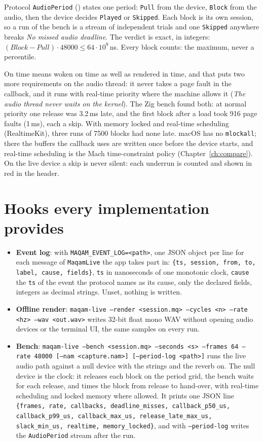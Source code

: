 \documentclass[11pt,oneside]{book}
\newcommand{\cmd}[1]{\texttt{#1}}
\begin{document}
Protocol \texttt{AudioPeriod} () states one
period: \texttt{Pull} from the device, \texttt{Block} from the audio, then the
device decides \texttt{Played} or \texttt{Skipped}. Each block is its own
session, so a run of the bench is a stream of independent trials and one
\texttt{Skipped} anywhere breaks \emph{No missed audio deadline}. The verdict
is exact, in integers: $(\mathit{Block}-\mathit{Pull}) \cdot 48000 \le 64
\cdot 10^9$\,ns. Every block counts: the maximum, never a percentile.

On time means woken on time as well as rendered in time, and that puts two
more requirements on the audio thread: it never takes a page fault in the
callback, and it runs with real-time priority where the machine allows it
(\emph{The audio thread never waits on the kernel}). The Zig bench found both:
at normal priority one release was 3.2\,ms late, and the first block after a
load took 916 page faults (1\,ms), each a skip. With memory locked and
real-time scheduling (RealtimeKit), three runs of 7500 blocks had none late.
macOS has no \texttt{mlockall}; there the buffers the callback uses are written
once before the device starts, and real-time scheduling is the Mach
time-constraint policy (Chapter~\ref{ch:compare}).
On the live device a skip is never silent: each underrun is counted and shown
in red in the header.

\section{Hooks every implementation provides}
\begin{itemize}
  \item \textbf{Event log}: with \texttt{MAQAM\_EVENT\_LOG=<path>}, one JSON
  object per line for each message of \texttt{MaqamLive} the app takes part in:
  \texttt{\{ts, session, from, to, label, cause, fields\}}, \texttt{ts} in
  nanoseconds of one monotonic clock, \texttt{cause} the \texttt{ts} of the
  event the protocol names as its cause, only the declared fields, integers as
  decimal strings. Unset, nothing is written.
  \item \textbf{Offline render}: \cmd{maqam-live --render <session.mq> --cycles
  <n> --rate <hz> --wav <out.wav>} writes 32-bit float mono WAV without opening
  audio devices or the terminal UI, the same samples on every run.
  \item \textbf{Bench}: \cmd{maqam-live --bench <session.mq> --seconds <s>
  --frames 64 --rate 48000 [--nam <capture.nam>] [--period-log <path>]} runs
  the live audio path against a null device with the strings and the reverb on.
  The null device is the clock: it releases each block on the period grid, the
  bench waits for each release, and times the block from release to hand-over,
  with real-time scheduling and locked memory where allowed. It prints one JSON
  line \texttt{\{frames, rate, callbacks, deadline\_misses, callback\_p50\_us,
  callback\_p99\_us, callback\_max\_us, release\_late\_max\_us, slack\_min\_us,
  realtime, memory\_locked\}}, and with \cmd{--period-log} writes the
  \texttt{AudioPeriod} stream after the run.
\end{itemize}
\end{document}
